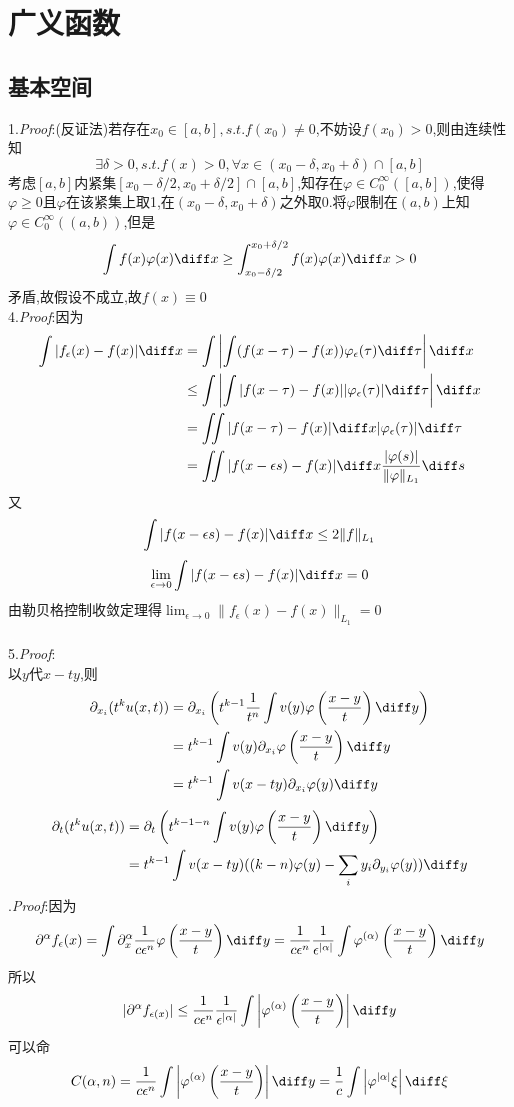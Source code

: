 \chapter{广义函数}
\section{基本空间}
1.\textit{Proof}:(反证法)若存在$x_0\in[a,b],s.t.f(x_0)\neq0$,不妨设$f(x_0)>0$,则由连续性知
\[\exists\delta>0,s.t.f(x)>0,\forall x\in(x_0-\delta,x_0+\delta)\cap[a,b]\]
考虑$[a,b]$内紧集$[x_0-\delta/2,x_0+\delta/2]\cap[a,b]$,知存在$\varphi\in C_0^{\infty}([a,b])$,使得$\varphi\geq0$且$\varphi$在该紧集上取1,在$(x_0-\delta,x_0+\delta)$之外取0.将$\varphi$限制在$(a,b)$上知$\varphi\in C_0^{\infty}((a,b))$,但是
\[\int f(x)\varphi(x)\diff x\geq\int_{x_0-\delta/2}^{x_0+\delta/2}f(x)\varphi(x)\diff x>0\]
矛盾,故假设不成立,故$f(x)\equiv0$\\
4.\textit{Proof}:因为
\[\begin{split}
\int|f_{\epsilon}(x)-f(x)|\diff x
&=\int\left|\int(f(x-\tau)-f(x))\varphi_{\epsilon}(\tau)\diff\tau\right|\diff x\\
&\leq\int\left|\int|f(x-\tau)-f(x)||\varphi_{\epsilon}(\tau)|\diff\tau\right|\diff x\\
&=\iint|f(x-\tau)-f(x)|\diff x|\varphi_{\epsilon}(\tau)|\diff\tau\\
&=\iint|f(x-\epsilon s)-f(x)|\diff x\frac{|\varphi(s)|}{\|\varphi\|_{L_1}}\diff s
\end{split}\]
又
\[\int|f(x-\epsilon s)-f(x)|\diff x\leq 2\|f\|_{L_1}\]
\[\lim_{\epsilon\to0}\int|f(x-\epsilon s)-f(x)|\diff x=0\]
由勒贝格控制收敛定理得$\lim_{\epsilon\to0}\|f_{\epsilon}(x)-f(x)\|_{L_1}=0$\\\\
5.\textit{Proof}:\\
以$y$代$x-ty$,则
\[\begin{split}
\partial_{x_i}(t^ku(x,t))
&=\partial_{x_i}\left(t^{k-1}\frac{1}{t^n}\int v(y)\varphi\left(\frac{x-y}{t}\right)\diff y\right)\\
&=t^{k-1}\int v(y)\partial_{x_i}\varphi\left(\frac{x-y}{t}\right)\diff y\\
&=t^{k-1}\int v(x-ty)\partial_{x_i}\varphi(y)\diff y
\end{split}\]
\[\begin{split}
\partial_t(t^ku(x,t))&=\partial_t\left(t^{k-1-n}\int v(y)\varphi\left(\frac{x-y}{t}\right)\diff y\right)\\
&=t^{k-1}\int v(x-ty)((k-n)\varphi(y)-\sum_iy_i\partial_{y_i}\varphi(y))\diff y
\end{split}\]
.\textit{Proof}:因为
\[\partial^{\alpha}f_{\epsilon}(x)=\int\partial_x^{\alpha}\frac{1}{c\epsilon^n}\varphi\left(\frac{x-y}{t}\right)\diff y=\frac{1}{c\epsilon^n}\frac{1}{\epsilon^{|\alpha|}}\int\varphi^{(\alpha)}\left(\frac{x-y}{t}\right)\diff y\]
所以
\[|\partial^{\alpha}f_{\epsilon(x)}|\leq\frac{1}{c\epsilon^n}\frac{1}{\epsilon^{|\alpha|}}\int\left|\varphi^{(\alpha)}\left(\frac{x-y}{t}\right)\right|\diff y\]
可以命
\[C(\alpha,n)=\frac{1}{c\epsilon^n}\int\left|\varphi^{(\alpha)}\left(\frac{x-y}{t}\right)\right|\diff y=\frac{1}{c}\int\left|\varphi^{|\alpha|}{\xi}\right|\diff\xi\]
